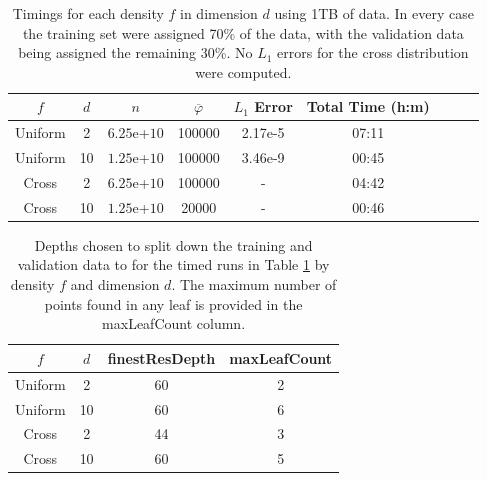 \documentclass{report}
\begin{document}
\begin{table}[H]
\begin{center}
\begin{tabular}{|c  c  c | c  | c | c | c | c | c |}
	\hline
	$f$ &  $d$ & $n$ &  $\overline{\varphi}$ & $L_1$ Error & Total Time (h:m) \\
	\hline
	Uniform 	& 2  & $6.25$e+$10$ & 100000 & 2.17e-5 & 07:11 \\
	Uniform 	& 10 & $1.25$e+$10$ & 100000 & 3.46e-9 & 00:45 \\
	\hline                 
	\hline
	Cross   	& 2  & $6.25$e+$10$ & 100000 & - & 04:42 \\
	Cross   	& 10 & $1.25$e+$10$ &  20000 & - & 00:46 \\
	\hline
\end{tabular}
\end{center}
\caption{Timings for each density $f$ in dimension $d$ using 1TB of data. In every case the training set were assigned 70\% of the data, with the validation data being assigned the remaining 30\%. No $L_1$ errors for the cross distribution were computed.}
\label{table_1TB}
\end{table}

\begin{table}[H]
\begin{center}
\begin{tabular}{|c  c | c | c |}
	\hline
	$f$ &  $d$ & finestResDepth & maxLeafCount\\
	\hline
	Uniform 	& 2  &  60 & 2  \\
	Uniform 	& 10 &  60 & 6  \\
	\hline                 
	\hline
	Cross   	& 2  &  44 & 3  \\
	Cross   	& 10 &  60 & 5  \\
	\hline
\end{tabular}
\end{center}
\caption{Depths chosen to split down the training and validation data to for the timed runs in Table \ref{table_1TB} by density $f$ and dimension $d$. The maximum number of points found in any leaf is provided in the maxLeafCount column.}
\label{depth_1TB}
\end{table}
\end{document}
